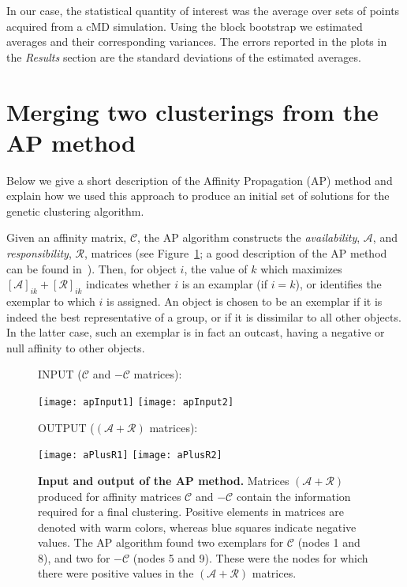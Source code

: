 \documentclass[a4paper,11pt,twoside]{book}%
\begin{document}
\begin{appendices}
In our case, the statistical quantity of interest was the average over sets of points acquired from a cMD simulation.
Using the block bootstrap we estimated averages and their corresponding variances.
The errors reported in the plots in the \emph{Results} section are the standard deviations of the estimated averages.


\section{Merging two clusterings from the AP method}\label{sec:appendixB}
Below we give a short description of the Affinity Propagation (AP) method and explain how we used this approach to produce an initial set of solutions for the genetic clustering algorithm.

Given an affinity matrix, $\mathcal{C}$, the AP algorithm constructs the \emph{availability}, $\mathcal{A}$, and \emph{responsibility}, $\mathcal{R}$, matrices (see Figure~\ref{fig:apExample}; a good description of the AP method can be found in~\cite{efron1992bootstrap}).
Then, for object $i$, the value of $k$ which maximizes $[\mathcal{A}]_{ik}+[\mathcal{R}]_{ik}$ indicates whether $i$ is an examplar (if $i=k$), or identifies the exemplar to which $i$ is assigned.
An object is chosen to be an exemplar if it is indeed the best representative of a group, or if it is dissimilar to all other objects.
In the latter case, such an exemplar is in fact an outcast, having a negative or null affinity to other objects.

\begin{figure}[h!]
\centering
INPUT ($\mathcal{C}$ and $-\mathcal{C}$ matrices):

\texttt{[image: apInput1]}%
\texttt{[image: apInput2]}

OUTPUT ($(\mathcal{A}+\mathcal{R})$ matrices):

\texttt{[image: aPlusR1]}%
\texttt{[image: aPlusR2]}
\caption{
{\bf Input and output of the AP method.}
Matrices $(\mathcal{A}+\mathcal{R})$ produced for affinity matrices $\mathcal{C}$ and $-\mathcal{C}$ contain the information required for a final clustering.
Positive elements in matrices are denoted with warm colors, whereas blue squares indicate negative values.
The AP algorithm found two exemplars for $\mathcal{C}$ (nodes 1 and 8), and two for $-\mathcal{C}$ (nodes 5 and 9).
These were the nodes for which there were positive values in the $(\mathcal{A}+\mathcal{R})$ matrices.
}
\label{fig:apExample}
\end{figure}


\end{appendices}
\end{document}
